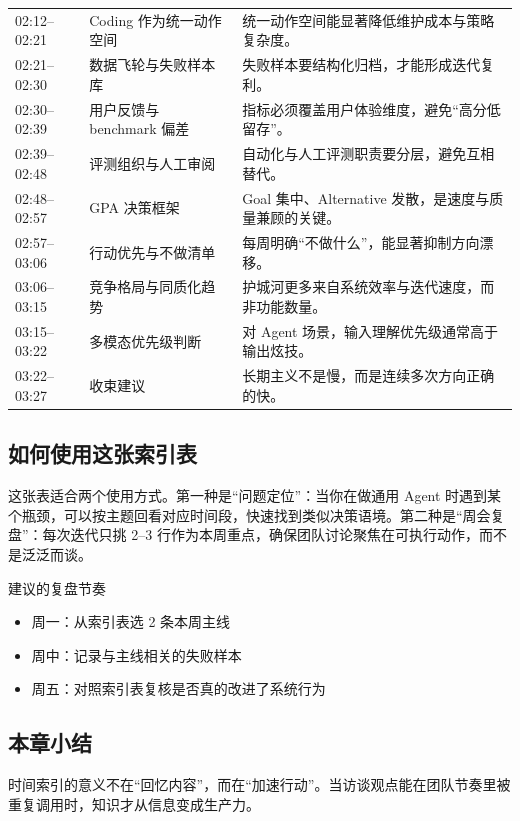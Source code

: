 \begin{longtable}{p{2.6cm}p{4.0cm}p{6.6cm}}
02:12--02:21 & Coding 作为统一动作空间 & 统一动作空间能显著降低维护成本与策略复杂度。 \\
02:21--02:30 & 数据飞轮与失败样本库 & 失败样本要结构化归档，才能形成迭代复利。 \\
02:30--02:39 & 用户反馈与 benchmark 偏差 & 指标必须覆盖用户体验维度，避免“高分低留存”。 \\
02:39--02:48 & 评测组织与人工审阅 & 自动化与人工评测职责要分层，避免互相替代。 \\
02:48--02:57 & GPA 决策框架 & Goal 集中、Alternative 发散，是速度与质量兼顾的关键。 \\
02:57--03:06 & 行动优先与不做清单 & 每周明确“不做什么”，能显著抑制方向漂移。 \\
03:06--03:15 & 竞争格局与同质化趋势 & 护城河更多来自系统效率与迭代速度，而非功能数量。 \\
03:15--03:22 & 多模态优先级判断 & 对 Agent 场景，输入理解优先级通常高于输出炫技。 \\
03:22--03:27 & 收束建议 & 长期主义不是慢，而是连续多次方向正确的快。 \\
\bottomrule
\end{longtable}

\subsection{如何使用这张索引表}

这张表适合两个使用方式。第一种是“问题定位”：当你在做通用 Agent 时遇到某个瓶颈，可以按主题回看对应时间段，快速找到类似决策语境。第二种是“周会复盘”：每次迭代只挑 2--3 行作为本周重点，确保团队讨论聚焦在可执行动作，而不是泛泛而谈。

\begin{importantbox}{建议的复盘节奏}
\begin{itemize}
    \item 周一：从索引表选 2 条本周主线
    \item 周中：记录与主线相关的失败样本
    \item 周五：对照索引表复核是否真的改进了系统行为
\end{itemize}
\end{importantbox}

\subsection{本章小结}

时间索引的意义不在“回忆内容”，而在“加速行动”。当访谈观点能在团队节奏里被重复调用时，知识才从信息变成生产力。


